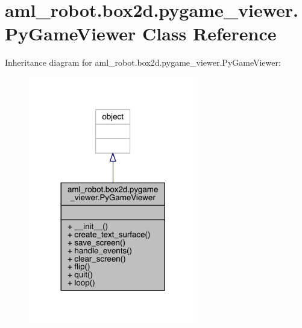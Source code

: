 \hypertarget{classaml__robot_1_1box2d_1_1pygame__viewer_1_1_py_game_viewer}{}\section{aml\+\_\+robot.\+box2d.\+pygame\+\_\+viewer.\+Py\+Game\+Viewer Class Reference}
\label{classaml__robot_1_1box2d_1_1pygame__viewer_1_1_py_game_viewer}


Inheritance diagram for aml\+\_\+robot.\+box2d.\+pygame\+\_\+viewer.\+Py\+Game\+Viewer\+:\nopagebreak
\begin{figure}[H]
\begin{center}
\leavevmode
\includegraphics[width=209pt]{classaml__robot_1_1box2d_1_1pygame__viewer_1_1_py_game_viewer__inherit__graph}
\end{center}
\end{figure}


